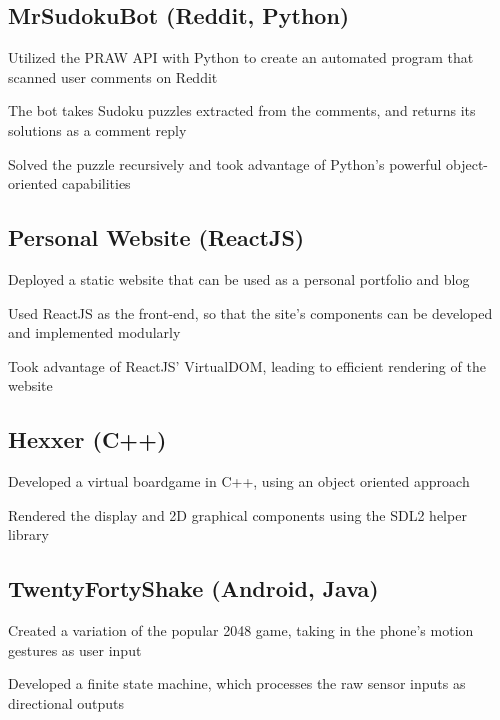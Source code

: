 \documentclass[10pt, letterpaper]{myCV}
\begin{document}
\subsection{MrSudokuBot (Reddit, Python)}
\begin{desc}
    \item Utilized the PRAW API with Python to create an automated program that scanned user comments on Reddit
    \item The bot takes Sudoku puzzles extracted from the comments, and returns its solutions as a comment reply
    \item Solved the puzzle recursively and took advantage of Python's powerful object-oriented capabilities
\end{desc}\subsection{Personal Website (ReactJS)}
\begin{desc}
    \item Deployed a static website that can be used as a personal portfolio and blog
    \item Used ReactJS as the front-end, so that the site's components can be developed and implemented modularly
    \item Took advantage of ReactJS' VirtualDOM, leading to efficient rendering of the website
\end{desc}
\subsection{Hexxer (C++)}
\begin{desc}
    \item Developed a virtual boardgame in C++, using an object oriented approach
    \item Rendered the display and 2D graphical components using the SDL2 helper library
\end{desc}
\subsection{TwentyFortyShake (Android, Java)}
\begin{desc}
    \item Created a variation of the popular 2048 game, taking in the phone's motion gestures as user input
    \item Developed a finite state machine, which processes the raw sensor inputs as directional outputs
\end{desc}
\end{document}
